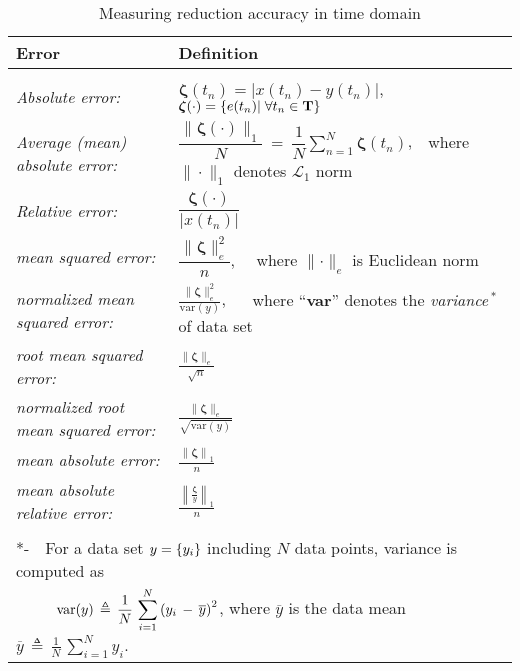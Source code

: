 \documentclass[10pt,oneside]{article}
\begin{document}
\begin{singlespace}
\begin{table}[!ht]
\renewcommand{\arraystretch}{1.2}
\caption{Measuring reduction accuracy in time domain} %
\centering
\begin{tabular}{ll}
\hline
\textbf{Error}   &   \textbf{Definition}\\ 
\hline \\
\emph{Absolute error:}&  
$\boldsymbol \zeta(t_n)= \big|x(t_n) - y(t_n)\big|$,~~~~~~
$\boldsymbol \zeta(\cdot)=\left\{e(t_n)|\;\forall t_n\in\mathbf{T}\right\}$\\[12pt] 
\emph{Average (mean) absolute error:}&  
$\dfrac{\big\|\boldsymbol \zeta(\cdot)\big\|_1}{N}\:=\:
\dfrac{1}{N}\sum\limits_{n=1}^N\boldsymbol \zeta(t_n)$,~~{\small where $\|\cdot\|_1$ denotes $\mathcal{L}_1$ norm} 
\\ [12pt]
\emph{Relative error:} & $\dfrac{\boldsymbol \zeta(\cdot)}{\big|x(t_n) \big|}$ \\ [12pt]
\emph{mean squared error:}  &   $\dfrac{\big\|{\boldsymbol \zeta}\|_e^2}{\displaystyle n}$,~~ {\small where $\|{\boldsymbol \cdot}\|_e$ is Euclidean norm} \\ [12pt]
%
\emph{normalized mean squared error:}  & $\frac{\displaystyle \|{\boldsymbol \zeta}\|_e^2}{\displaystyle \mathrm{var}(y)}$, ~~ {\small where ``\textbf{var}'' denotes the \emph{variance}$\,^\ast$ of data set}\\ [12pt]
%
\emph{root mean squared error:}   &   $\frac{\displaystyle \|{\boldsymbol \zeta}\|_e}{\displaystyle \sqrt{n}}$\\ [12pt]
%
\emph{normalized root mean squared error:}  & $\frac{\displaystyle \|{\boldsymbol \zeta}\|_e}{\displaystyle \sqrt{\mathrm{var}(y)}}$\\ [12pt]
%
\emph{mean absolute error:}   &   $\frac{\displaystyle \left\|{\boldsymbol \zeta}\right\|_1}{\displaystyle n}$ \\ [12pt]
%
\emph{mean absolute relative error:}&  $\frac{  \displaystyle \left\|\frac{\displaystyle {\boldsymbol \zeta}}{y}\right\|_1 }{\displaystyle n}$ \\ [12pt]
%
\hline\\[12pt]
%
%
\multicolumn{2}{l}{*-~~For a data set $y=\left\{y_i\right\}$ including $N$ data points,  variance is computed as}\\ 
\multicolumn{2}{l}{~~~~~$\displaystyle \mathrm{var}(y)\,\triangleq \,\frac{\displaystyle 1}{N}\,\sum\limits^{N}_{i=1}{\left(y_i\,-\,\overline{y}\right)^2}$, where $\overline{y}$ is the data mean $\displaystyle \overline{y}\,\triangleq\,\frac{1}{N}\,\sum\limits^{N}_{i=1}{y_i}$.}\\
\end{tabular}
\label{tab:definitions-of-error}
\end{table}
\end{singlespace}
\end{document}
